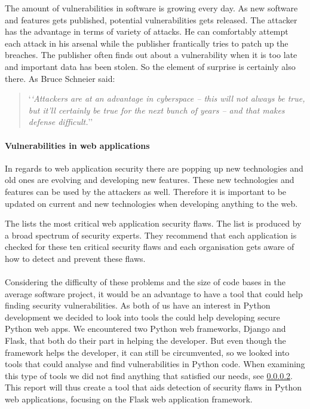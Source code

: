 The amount of vulnerabilities in software is growing every day.
As new software and features gets published, potential vulnerabilities gets released.
The attacker has the advantage in terms of variety of attacks.
He can comfortably attempt each attack in his arsenal while the publisher frantically tries to patch up the breaches.
The publisher often finds out about a vulnerability when it is too late and important data has been stolen.
So the element of surprise is certainly also there.
As Bruce Schneier said:
\begin{quote}
`\textit{`Attackers are at an advantage in cyberspace – this will not always be true, but it’ll certainly be true for the next bunch of years – and that makes defense difficult.}''\cite{schneier_interview}  
\end{quote}

\paragraph{Vulnerabilities in web applications}
In regards to web application security there are popping up new technologies and old ones are evolving and developing new features.
These new technologies and features can be used by the attackers as well.
Therefore it is important to be updated on current and new technologies when developing anything to the web.\cite{web_security_importance}

The \citet{OWASP10} lists the most critical web application security flaws.
The list is produced by a broad spectrum of security experts. 
They recommend that each application is checked for these ten critical security flaws and each organisation gets aware of how to detect and prevent these flaws.

\paragraph{}
Considering the difficulty of these problems and the size of code bases in the average software project, it would be an advantage to have a tool that could help finding security vulnerabilities.
As both of us have an interest in Python development we decided to look into tools the could help developing secure Python web apps.
We encountered two Python web frameworks, Django and Flask, that both do their part in helping the developer.
But even though the framework helps the developer, it can still be circumvented, so we looked into tools that could analyse and find vulnerabilities in Python code.
When examining this type of tools we did not find anything that satisfied our needs, see \cref{}.
This report will thus create a tool that aids detection of security flaws in Python web applications, focusing on the Flask web application framework.
